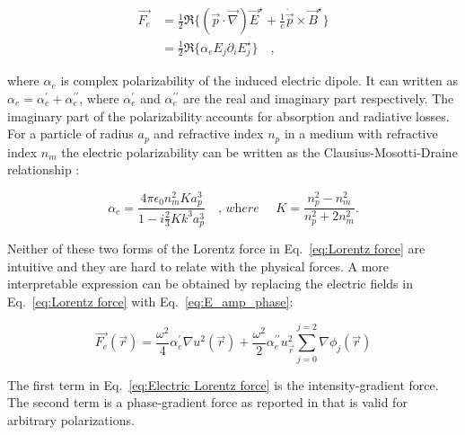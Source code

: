 \begin{equation}
\label{eq:Lorentz force}
\begin{split}
\vec{F_e} & = \frac{1}{2} \Re \lbrace (\vec{p}\cdot \vec{\nabla})\vec{E}^\star + \frac{1}{c} \dot{\vec{p}}\times \vec{B}^\star \rbrace \\
				& = \frac{1}{2} \Re \lbrace \alpha _{e} E_j \partial _i E^\star _{j} \rbrace \quad ,
\end{split}
\end{equation}

where $\alpha _e$ is complex polarizability of the induced electric dipole. It can written as $\alpha _e = \alpha^{\prime}_e + \alpha ^{\prime \prime}_{e}$, where $\alpha ^{\prime}_{e}$ and $\alpha ^{\prime \prime}_{e}$ are the real and imaginary part \cite{jackson_classical_1999} respectively. The imaginary part of the polarizability accounts for absorption and radiative losses. For a particle of radius $a_p$ and refractive index $n_p$ in a medium with refractive index $n_m$ the electric polarizability can be written as the Clausius-Mosotti-Draine relationship \cite{draine1993}:

\begin{equation}
\alpha _e = \frac{4\pi \epsilon _0 n^2_m K a^3_p}{1-i\frac{2}{3}K k^3 a^3_p} \quad \textit{, where }\quad K = \frac{n^2_p - n^2_m}{n^2_p + 2n^2_m}.
\end{equation}

Neither of these two forms of the Lorentz force in Eq.~\eqref{eq:Lorentz force} are intuitive and they are hard to relate with the physical forces. A more interpretable expression can be obtained by replacing the electric fields in Eq.~\eqref{eq:Lorentz force} with Eq.~\eqref{eq:E_amp_phase}:

\begin{equation}
\label{eq:Electric Lorentz force}
\vec{F_e}(\vec{r}) = \frac{\omega ^2}{4}\alpha ^{\prime} _{e} \nabla u^2(\vec{r}) + \frac{\omega ^2}{2} \alpha ^{\prime \prime}_{e} u^2_{\vec{r}}\sum _{j=0}^{j=2} \nabla \phi _{j}(\vec{r})
\end{equation}

The first term in Eq.~\eqref{eq:Electric Lorentz force} is the intensity-gradient force. The second term is a phase-gradient force as reported in \cite{roichman2008} that is valid for arbitrary polarizations.




